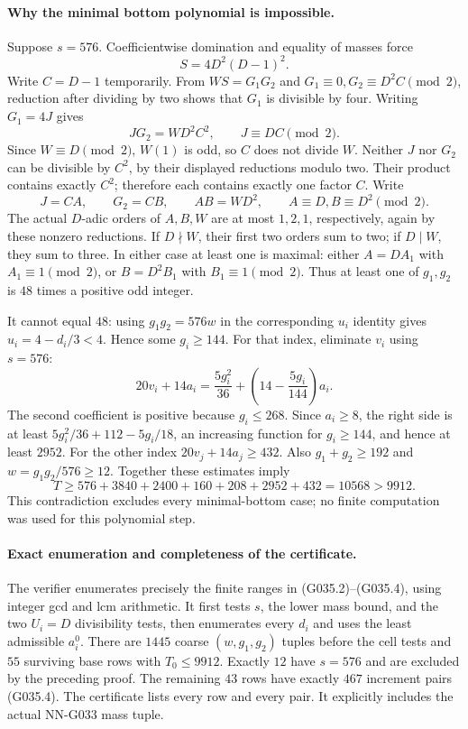 \paragraph{Why the minimal bottom polynomial is impossible.}
Suppose $s=576$. Coefficientwise domination and equality
of masses force
\[
                  S=4D^2(D-1)^2.                    \tag{G035.5}
\]
Write $C=D-1$ temporarily. From $WS=G_1G_2$ and
$G_1\equiv0,G_2\equiv D^2C\pmod2$, reduction after
dividing by two shows that $G_1$ is divisible by four.
Writing $G_1=4J$ gives
\[
             JG_2=WD^2C^2,\qquad J\equiv DC\pmod2.
\]
Since $W\equiv D\pmod2$, $W(1)$ is odd, so $C$
does not divide $W$. Neither $J$ nor $G_2$ can be
divisible by $C^2$, by their displayed reductions
modulo two. Their product contains exactly $C^2$;
therefore each contains exactly one factor $C$.
Write
\[
          J=CA,\qquad G_2=CB,\qquad
          AB=WD^2,\qquad A\equiv D, B\equiv D^2\pmod2.
\]
The actual $D$-adic orders of $A,B,W$ are at most
$1,2,1$, respectively, again by these nonzero reductions.
If $D\nmid W$, their first two orders sum to two;
if $D\mid W$, they sum to three. In either case
at least one is maximal: either $A=DA_1$ with
$A_1\equiv1\pmod2$, or $B=D^2B_1$ with
$B_1\equiv1\pmod2$.
Thus at least one of $g_1,g_2$ is $48$ times a
positive odd integer.

It cannot equal $48$: using $g_1g_2=576w$ in
the corresponding $u_i$ identity gives
$u_i=4-d_i/3<4$.
Hence some $g_i\ge144$.
For that index, eliminate $v_i$ using $s=576$:
\[
 20v_i+14a_i=\frac{5g_i^2}{36}
                   +\left(14-\frac{5g_i}{144}\right)a_i.
\]
The second coefficient is positive because $g_i\le268$.
Since $a_i\ge8$, the right side is at least
$5g_i^2/36+112-5g_i/18$, an increasing function for
$g_i\ge144$, and hence at least $2952$.
For the other index $20v_j+14a_j\ge432$.
Also $g_1+g_2\ge192$ and $w=g_1g_2/576\ge12$.
Together these estimates imply
\[
 T\ge576+3840+2400+160+208+2952+432
       =10568>9912.
\]
This contradiction excludes every minimal-bottom case;
no finite computation was used for this polynomial step.

\paragraph{Exact enumeration and completeness of the certificate.}
The verifier enumerates precisely the finite ranges in
(G035.2)--(G035.4), using integer gcd and lcm arithmetic.
It first tests $s$, the lower mass bound, and the two
$U_i=D$ divisibility tests, then enumerates every $d_i$
and uses the least admissible $a_i^0$.
There are $1445$ coarse $(w,g_1,g_2)$ tuples before
the cell tests and $55$ surviving base rows with
$T_0\le9912$. Exactly $12$ have $s=576$ and are
excluded by the preceding proof. The remaining $43$
rows have exactly $467$ increment pairs (G035.4).
The certificate lists every row and every pair.
It explicitly includes the actual NN-G033 mass tuple.

